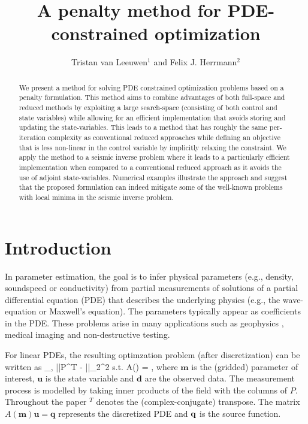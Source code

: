 \documentclass{iopart}
\begin{document}
\title[A penalty method for PDE-constrained optimization]{A penalty method for PDE-constrained optimization}
\author{Tristan van Leeuwen$^1$ and Felix J. Herrmann$^2$}
\address{$^1$Centrum Wiskunde \& Informatica. Science Park, Amsterdam, the Netherlands\\
$^2$ Dept. of Earth, Ocean and Atmospheric Sciences.\\2207 Main Mall, Vancouver, BC Canada V6T 1Z4.}

\begin{abstract}
We present a method for solving PDE constrained optimization problems
based on a penalty formulation. This method aims to combine advantages
of both full-space and reduced methods by exploiting a large
search-space (consisting of both control and state variables) while
allowing for an efficient implementation that avoids storing and
updating the state-variables. This leads to a method that has roughly
the same per-iteration complexity as conventional reduced approaches
while defining an objective that is less non-linear in the control
variable by implicitly relaxing the constraint. We apply the method to a
seismic inverse problem where it leads to a particularly efficient
implementation when compared to a conventional reduced approach as it
avoids the use of adjoint state-variables. Numerical examples illustrate
the approach and suggest that the proposed formulation can indeed
mitigate some of the well-known problems with local minima in the
seismic inverse problem.
\end{abstract}

\maketitle

\section{Introduction}
In parameter estimation, the goal is to infer physical parameters (e.g., density, soundspeed or conductivity) 
from partial measurements of solutions of a partial differential equation (PDE) that describes the underlying physics (e.g., the wave-equation or Maxwell's equation). 
The parameters typically appear as coefficients in the PDE. These problems arise in many applications such as
geophysics \cite{Haber2004,Epanomeritakis08}, medical imaging \cite{Abdoulaev2005} and non-destructive testing.

For linear PDEs, the resulting optimzation problem (after discretization) can be written as
\bq
\label{eq:constr}
\min_{,} ||P^T - ||_2^2 \quad 
\mbox{s.t.} \quad A() = ,
\eq
where $\mathbf{m}$ is the (gridded) parameter of interest, $\mathbf{u}$ is the state variable and $\mathbf{d}$ are
the observed data. The measurement process is modelled by taking inner products of the field with the columns of $P$. 
Throughout the paper $^T$ denotes the (complex-conjugate) transpose. The matrix $A(\mathbf{m})\mathbf{u} = \mathbf{q}$ 
represents the discretized PDE and $\mathbf{q}$ is the source function. 
\end{document}
